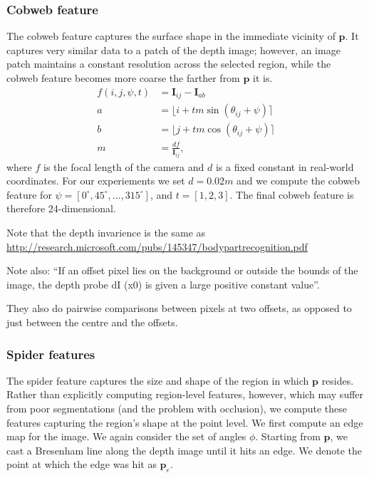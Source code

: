 \documentclass[10pt,twocolumn,letterpaper]{article}
\newcommand{\rgbdimage}{\mathbf{I}}
\newcommand{\point}{\mathbf{p}}
\newcommand{\degree}{^{\circ}}
\begin{document}
\subsubsection{Cobweb feature}
The cobweb feature captures the surface shape in the immediate vicinity of $\point$. 
It captures very similar data to a patch of the depth image; however, an image patch maintains a constant resolution across the selected region, while the cobweb feature becomes more coarse the farther from $\point$ it is.
\begin{align}
f(i, j, \psi, t) &= \rgbdimage_{ij} - \rgbdimage_{ab} \\
a &= \lfloor i + tm\sin(\theta_{ij}+\psi)\rceil \\
b &= \lfloor j + tm\cos(\theta_{ij}+\psi)\rceil \\
m &= \frac{df}{\rgbdimage_{ij}},
\end{align}
where $f$ is the focal length of the camera and $d$ is a fixed constant in real-world coordinates. For our experiements we set $d=0.02m$ and we compute the cobweb feature for $\psi = [0\degree, 45\degree, \ldots, 315\degree]$, and $t = [1, 2, 3]$. 
The final cobweb feature is therefore 24-dimensional.

Note that the depth invarience is the same as \url{http://research.microsoft.com/pubs/145347/bodypartrecognition.pdf}

Note also: ``If an offset pixel lies on the background
or outside the bounds of the image, the depth probe dI (x0) is given a large positive constant value''.

They also do pairwise comparisons between pixels at two offsets, as opposed to just between the centre and the offsets.




\subsubsection{Spider features}
The spider feature captures the size and shape of the region in which $\point$ resides. 
Rather than explicitly computing region-level features, however, which may suffer from poor segmentations (and the problem with occlusion), we compute these features capturing the region's shape at the point level. 
We first compute an edge map for the image.
We again consider the set of angles $\phi$. Starting from $\point$, we cast a Bresenham line along the depth image until it hits an edge. 
We denote the point at which the edge was hit as $\point_{e}$.
\end{document}
